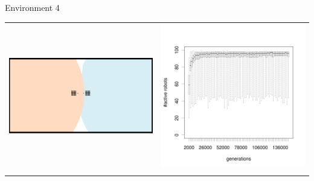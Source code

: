 \documentclass[8pt, handout=show,notes=show]{beamer}
\begin{document}
\begin{frame}{Environment 4}

\begin{table}[H]
\centering
\begin{tabular}{cc}
\includegraphics[width=\imgSize]{../images/5StaticEnv/environments/staticEnv4}&\includegraphics[width=\imgSize]{../images/5StaticEnv/alive_staticEnv4}\\
\newline

\end{tabular}
\end{table}
\end{frame}
\end{document}
